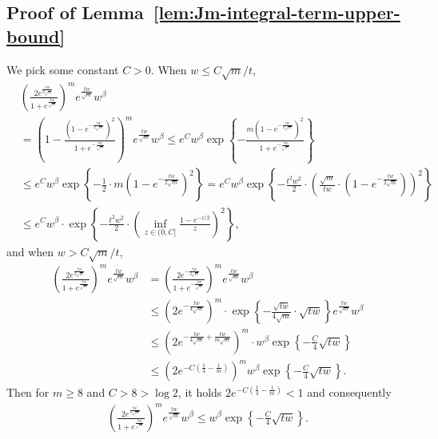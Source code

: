 \documentclass[11pt]{article}
\newcommand{\brc}[1]{\left\{{#1}\right\}}
\newcommand{\prn}[1]{\left({#1}\right)} %
\newcommand{\<}{\langle} %
\renewcommand{\>}{\rangle}
\begin{document}
\subsection{Proof of Lemma~\ref{lem:Jm-integral-term-upper-bound}} \label{proof:Jm-integral-term-upper-bound}
We pick some constant $C > 0$. When $w \leq C\sqrt{m}/t$,
\begin{align*}
	& \prn{\frac{2e^{\frac{tw}{2\sqrt{m}}}}{1 + e^{\frac{tw}{\sqrt{m}}}}}^{m} e^{\frac{tw}{\sqrt{m}}} w^\beta \nonumber \\
	& = \prn{1 - \frac{\prn{1-e^{-\frac{tw}{2\sqrt{m}}}}^2}{1 + e^{-\frac{tw}{\sqrt{m}}}}}^{m} e^{\frac{tw}{\sqrt{m}}} w^\beta \leq e^C  w^\beta  \exp \brc{-\frac{m\prn{1-e^{-\frac{tw}{2\sqrt{m}}}}^2}{1 + e^{-\frac{tw}{\sqrt{m}}}} }  \nonumber \\
	&  \leq e^C  w^\beta \exp \brc{-\frac{1}{2} \cdot m\prn{1-e^{-\frac{tw}{2\sqrt{m}}}}^2 } = e^C  w^\beta \exp \brc{-\frac{t^2w^2}{2} \cdot \prn{\frac{\sqrt{m}}{tw} \cdot \prn{1-e^{-\frac{tw}{2\sqrt{m}}}}}^2 }  \nonumber \\
	& \leq e^C w^\beta \cdot \exp \left\{-\frac{t^2 w^2}{2} \cdot \prn{\inf_{z \in (0, C]} \frac{1-e^{-z/2}}{z} }^2 \right\} ,
\end{align*}
and when $w > C\sqrt{m}/t$,
\begin{align*}
	\prn{\frac{2e^{\frac{tw}{2\sqrt{m}}}}{1 + e^{\frac{tw}{\sqrt{m}}}}}^{m} e^{\frac{tw}{\sqrt{m}}} w^\beta & = \prn{\frac{2e^{-\frac{tw}{2\sqrt{m}}}}{1 + e^{-\frac{tw}{\sqrt{m}}}}}^{m} e^{\frac{tw}{\sqrt{m}}} w^\beta \nonumber \\
	& \leq \prn{2e^{-\frac{tw}{4\sqrt{m}}}}^m \cdot \exp \brc{-\frac{\sqrt{tw}}{4\sqrt{m}} \cdot \sqrt{tw}} e^{\frac{tw}{\sqrt{m}}}w^\beta \nonumber \\
	& \leq \prn{2e^{-\frac{tw}{4\sqrt{m}} + \frac{tw}{m\sqrt{m}}}}^m \cdot w^\beta \exp \brc{-\frac{C}{4} \sqrt{tw}} \nonumber \\
	& \leq \prn{2e^{-C\prn{\frac{1}{4} - \frac{1}{m}}}}^m  w^\beta \exp \brc{-\frac{C}{4} \sqrt{tw}} .
\end{align*}
Then for $m \geq 8$ and $C > 8 > \log 2$, it holds $2e^{-C\prn{\frac{1}{4} - \frac{1}{m}}} < 1$ and consequently
\begin{align*}
	\prn{\frac{2e^{\frac{tw}{2\sqrt{m}}}}{1 + e^{\frac{tw}{\sqrt{m}}}}}^{m} e^{\frac{tw}{\sqrt{m}}} w^\beta \le w^\beta \exp \brc{-\frac{C}{4} \sqrt{tw}}.
\end{align*}
\end{document}
